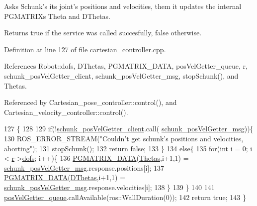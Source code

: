 Asks Schunk's its joint's positions and velocities, them it updates the internal P\-G\-M\-A\-T\-R\-I\-Xs Theta and D\-Thetas. 

\begin{DoxyReturn}{Returns}
true if the service was called succesfully, false otherwise. 
\end{DoxyReturn}


Definition at line 127 of file cartesian\-\_\-controller.\-cpp.



References Robot\-::dofs, D\-Thetas, P\-G\-M\-A\-T\-R\-I\-X\-\_\-\-D\-A\-T\-A, pos\-Vel\-Getter\-\_\-queue, r, schunk\-\_\-pos\-Vel\-Getter\-\_\-client, schunk\-\_\-pos\-Vel\-Getter\-\_\-msg, stop\-Schunk(), and Thetas.



Referenced by Cartesian\-\_\-pose\-\_\-controller\-::control(), and Cartesian\-\_\-velocity\-\_\-controller\-::control().


\begin{DoxyCode}
127                                                                                    \{
128 
129         \textcolor{keywordflow}{if}(!\hyperlink{classCartesian__controller_a5c1d9386bc5f219f2edc0d5d1b21f0da}{schunk\_posVelGetter\_client}.call(
      \hyperlink{classCartesian__controller_ae368dcf84dae528612c617cc92fbb69f}{schunk\_posVelGetter\_msg}))\{
130                 ROS\_ERROR\_STREAM(\textcolor{stringliteral}{"Couldn't get schunk's positions and velocities, aborting"});
131                 \hyperlink{classCartesian__controller_a3ba54e8b35632526c5e8eb2ab5d7de0d}{stopSchunk}();
132                 \textcolor{keywordflow}{return} \textcolor{keyword}{false};
133         \}
134         \textcolor{keywordflow}{else}\{
135                 \textcolor{keywordflow}{for}(\textcolor{keywordtype}{int} i = 0; i < \hyperlink{classCartesian__controller_a5562129951bd802e4ded77fc716c87a0}{r}->\hyperlink{structRobot_a51d4a86ac5314a1ed8614d5664c80747}{dofs}; i++)\{
136                         \hyperlink{gmatrix_8h_a7333180c47234295df2bd7b09ac00da8}{PGMATRIX\_DATA}(\hyperlink{classCartesian__controller_a0a0f818dad601cd9e3e26cb6959b8eb6}{Thetas},i+1,1) = 
      \hyperlink{classCartesian__controller_ae368dcf84dae528612c617cc92fbb69f}{schunk\_posVelGetter\_msg}.response.positions[i];
137                         \hyperlink{gmatrix_8h_a7333180c47234295df2bd7b09ac00da8}{PGMATRIX\_DATA}(\hyperlink{classCartesian__controller_a5d6419e62e130150edfcbd82b1dadcae}{DThetas},i+1,1) = 
      \hyperlink{classCartesian__controller_ae368dcf84dae528612c617cc92fbb69f}{schunk\_posVelGetter\_msg}.response.velocities[i];
138                 \}
139         \}
140 
141         \hyperlink{classCartesian__controller_a144c7faad45f3d070624452c1f02ba15}{posVelGetter\_queue}.callAvailable(ros::WallDuration(0));
142         \textcolor{keywordflow}{return} \textcolor{keyword}{true};
143 \}
\end{DoxyCode}


